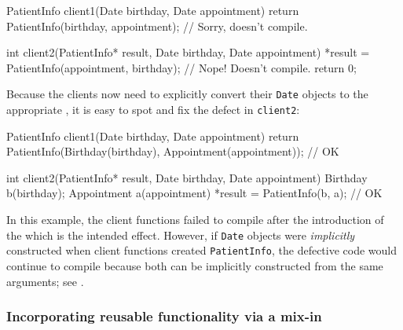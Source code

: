 \begin{emcppslisting}[language=C++]
PatientInfo client1(Date birthday, Date appointment)
{
    return PatientInfo(birthday, appointment);  // Sorry, doesn't compile.
}

int client2(PatientInfo* result, Date birthday, Date appointment)
{
    *result = PatientInfo(appointment, birthday);  // Nope! Doesn't compile.
    return 0;
}
\end{emcppslisting}
Because the clients now need to explicitly convert their \lstinline!Date! objects to the appropriate , it is easy to spot and fix the defect in \lstinline!client2!:
\begin{emcppslisting}
PatientInfo client1(Date birthday, Date appointment)
{
    return PatientInfo(Birthday(birthday), Appointment(appointment));  // OK
}

int client2(PatientInfo* result, Date birthday, Date appointment)
{
    Birthday b(birthday);
    Appointment a(appointment)
    *result = PatientInfo(b, a);  // OK
}
\end{emcppslisting}
    
\noindent 
In this example, the client functions failed to compile after the introduction of the  which is the intended effect. However, if \lstinline!Date! objects were \emph{implicitly} constructed when client functions created \lstinline!PatientInfo!, the defective code would continue to compile because both  can be implicitly constructed from the same arguments; see .

\subsubsection[Incorporating reusable functionality via a mix-in]{Incorporating reusable functionality via a mix-in}\label{incorporating-reusable-functionality-via-a-mix-in-class}

